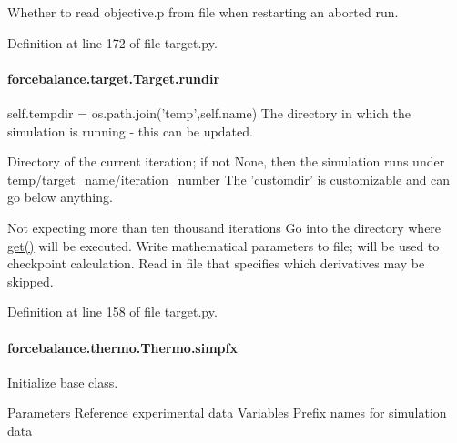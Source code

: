 Whether to read objective.\-p from file when restarting an aborted run. 



Definition at line 172 of file target.\-py.

\hypertarget{classforcebalance_1_1target_1_1Target_a6872de5b2d4273b82336ea5b0da29c9e}{
\paragraph[{rundir}]{\setlength{\rightskip}{0pt plus 5cm}forcebalance.\-target.\-Target.\-rundir\hspace{0.3cm}{\ttfamily [inherited]}}}\label{classforcebalance_1_1target_1_1Target_a6872de5b2d4273b82336ea5b0da29c9e}


self.\-tempdir = os.\-path.\-join('temp',self.\-name) The directory in which the simulation is running -\/ this can be updated. 

Directory of the current iteration; if not None, then the simulation runs under temp/target\-\_\-name/iteration\-\_\-number The 'customdir' is customizable and can go below anything.

Not expecting more than ten thousand iterations Go into the directory where \hyperlink{classforcebalance_1_1target_1_1Target_a1389888302c49d529716cb45b13a6f5a}{get()} will be executed. Write mathematical parameters to file; will be used to checkpoint calculation. Read in file that specifies which derivatives may be skipped. 

Definition at line 158 of file target.\-py.

\hypertarget{classforcebalance_1_1thermo_1_1Thermo_ab0c5f73c4c9812e2d733ffb0f65edeb9}{
\paragraph[{simpfx}]{\setlength{\rightskip}{0pt plus 5cm}forcebalance.\-thermo.\-Thermo.\-simpfx}}\label{classforcebalance_1_1thermo_1_1Thermo_ab0c5f73c4c9812e2d733ffb0f65edeb9}


Initialize base class. 

Parameters Reference experimental data Variables Prefix names for simulation data 

